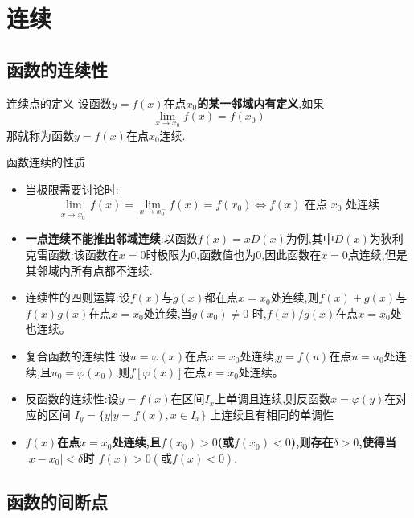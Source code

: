 \documentclass[8pt a4paper, oneside, UTF8]{ctexbook}
\begin{document}
\begin{sloppypar}
    \else
    \fi
    \chapter{连续}
    \section{函数的连续性}
    \begin{defn}{连续点的定义}{}
        设函数$y=f(x)$在点$x_0$\textbf{的某一邻域内有定义},如果
        $$
            \lim_{x\to x_0}f(x)=f(x_0)
        $$
        那就称为函数$y=f(x)$在点$x_0$连续.
    \end{defn}
    \begin{criterion}{函数连续的性质}{}
        \begin{itemize}
            \item 当极限需要讨论时:
            $$
                \lim_{x\to x_0^+}f\left(x\right)=\lim_{x\to x_0^-}f\left(x\right)=f\left(x_0\right)\Leftrightarrow f\left(x\right)\text{ 在点 }x_0\text{ 处连续}
            $$
            \item \textbf{一点连续不能推出邻域连续}:以函数$f(x)=x D(x)$为例,其中$D(x)$为狄利克雷函数:该函数在$x=0$时极限为0,函数值也为0,因此函数在$x=0$点连续,但是其邻域内所有点都不连续.
            \item 连续性的四则运算:设$f(x)$与$g(x)$都在点$x=x_0$处连续,则$f(x)\pm g(x)$与$f(x)g(x)$在点$x=x_{0}$处连续,当$g(x_0)\neq0$ 时,$f(x)/g(x)$在点$x=x_{0}$处也连续。
            \item 复合函数的连续性:设$u=\varphi(x)$在点$x=x_0$处连续,$y=f(u)$在点$u=u_0$处连续,且$u_{0}=\varphi(x_{0})$,则$f\left[\varphi(x)\right]$在点$x=x_{0}$处连续。
            \item 反函数的连续性:设$y=f(x)$在区间$I_x$上单调且连续,则反函数$x=\varphi(y)$在对应的区间 $I_{y}=\{y|y=f(x),x\in I_{x}\}$ 上连续且有相同的单调性
            \item \textbf{$f(x)$在点$x=x_0$处连续,且$f(x_0)>0$(或$f(x_0)<0$),则存在$\delta>0$,使得当$|x-x_0|<\delta$时 $f\left(x\right)>0\left(\text{或}f\left(x\right)<0\right).$ }
        \end{itemize}
    \end{criterion}
    \section{函数的间断点}

\end{sloppypar}
\end{document}
